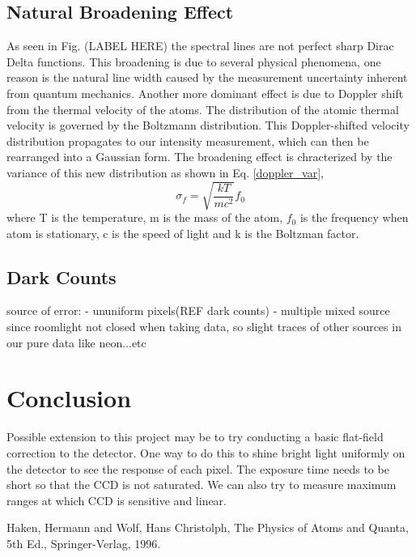 \documentclass[authoryear, 12pt,5p, times]{elsarticle}
\begin{document}
	 \subsection{Natural Broadening Effect}
 As seen in Fig. (LABEL HERE) the spectral lines are not perfect sharp Dirac Delta functions. This broadening is due to several physical phenomena, one reason is the natural line width caused by the measurement uncertainty inherent from quantum mechanics. Another more dominant effect is due to Doppler shift from the thermal velocity of the atoms. The distribution of the atomic thermal velocity is governed by the Boltzmann distribution. This Doppler-shifted velocity distribution propagates to our intensity measurement, which can then be rearranged into a Gaussian form. The broadening effect is chracterized by the variance of this new distribution as shown in  Eq. \ref{doppler_var},
 \begin{equation}\label{doppler_var}
\sigma_f = \sqrt{\frac{kT}{mc^2}}f_0
 \end{equation}
 where T is the temperature, m is the mass of the atom, $f_0$ is the frequency when atom is stationary, c is the speed of light and k is the Boltzman factor.
 
 \subsection{Dark Counts}
 
source of error: 
- ununiform pixels(REF dark counts)
- multiple mixed source since roomlight not closed when taking data, so slight traces of other sources in our pure data like neon...etc
 
\section{Conclusion}

Possible extension to this project may be to try conducting a basic flat-field correction to the detector. One way to do this to shine bright light uniformly on the detector to see the response of each pixel.  The exposure time needs to be short so that the CCD is not saturated. We can also try to measure maximum ranges at which CCD is sensitive and linear.

%
%
%

Haken, Hermann and Wolf, Hans Christolph, The Physics of Atoms and Quanta, 5th Ed., Springer-Verlag, 1996.
\end{document}
